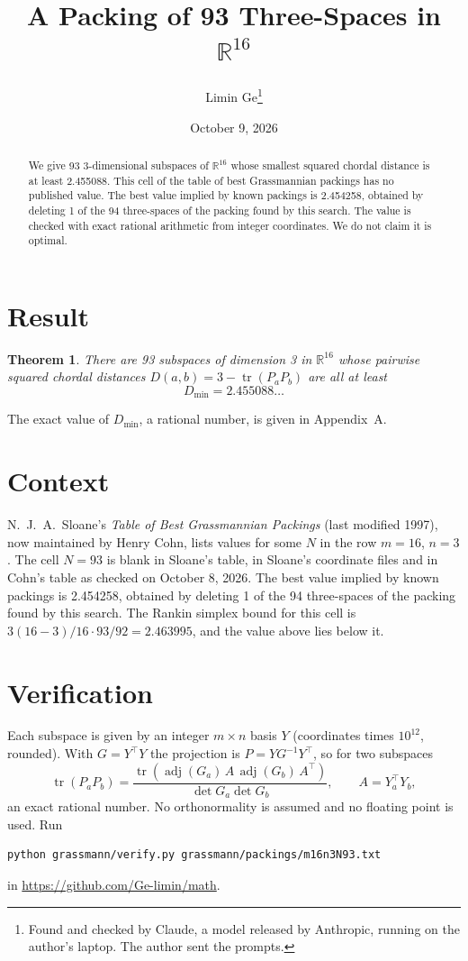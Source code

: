 \documentclass[11pt,a4paper]{article}
\title{A Packing of 93 Three-Spaces in $\mathbb{R}^{16}$}
\author{Limin Ge\thanks{Found and checked by Claude, a model released by Anthropic, running on the author's laptop. The author sent the prompts.}}
\date{October 9, 2026}
\newtheorem*{theorem}{Theorem}
\begin{document}
\maketitle
\begin{abstract}
We give 93 3-dimensional subspaces of $\mathbb{R}^{16}$ whose smallest squared chordal distance is at least 2.455088. This cell of the table of best Grassmannian packings has no published value. The best value implied by known packings is 2.454258, obtained by deleting 1 of the 94 three-spaces of the packing found by this search. The value is checked with exact rational arithmetic from integer coordinates. We do not claim it is optimal.
\end{abstract}

\section{Result}
\begin{theorem}
There are 93 subspaces of dimension 3 in $\mathbb{R}^{16}$ whose pairwise squared chordal distances $D(a,b) = 3 - \operatorname{tr}(P_aP_b)$ are all at least
\[ D_{\min} = 2.455088\ldots \]
\end{theorem}
The exact value of $D_{\min}$, a rational number, is given in Appendix~A.


\section{Context}
N.~J.~A.~Sloane's \emph{Table of Best Grassmannian Packings} (last modified 1997), now maintained by Henry Cohn, lists values for some $N$ in the row $m=16$, $n=3$. The cell $N=93$ is blank in Sloane's table, in Sloane's coordinate files and in Cohn's table as checked on October 8, 2026. The best value implied by known packings is 2.454258, obtained by deleting 1 of the 94 three-spaces of the packing found by this search. The Rankin simplex bound for this cell is $3(16-3)/16\cdot 93/92 = 2.463995$, and the value above lies below it.


\section{Verification}
Each subspace is given by an integer $m\times n$ basis $Y$ (coordinates times $10^{12}$, rounded). With $G=Y^\top Y$ the projection is $P=YG^{-1}Y^\top$, so for two subspaces
\[ \operatorname{tr}(P_aP_b)=\frac{\operatorname{tr}(\operatorname{adj}(G_a)\,A\,\operatorname{adj}(G_b)\,A^\top)}{\det G_a\det G_b},\qquad A=Y_a^\top Y_b, \]
an exact rational number. No orthonormality is assumed and no floating point is used. Run
\begin{verbatim}
python grassmann/verify.py grassmann/packings/m16n3N93.txt
\end{verbatim}
in \url{https://github.com/Ge-limin/math}.
\end{document}

